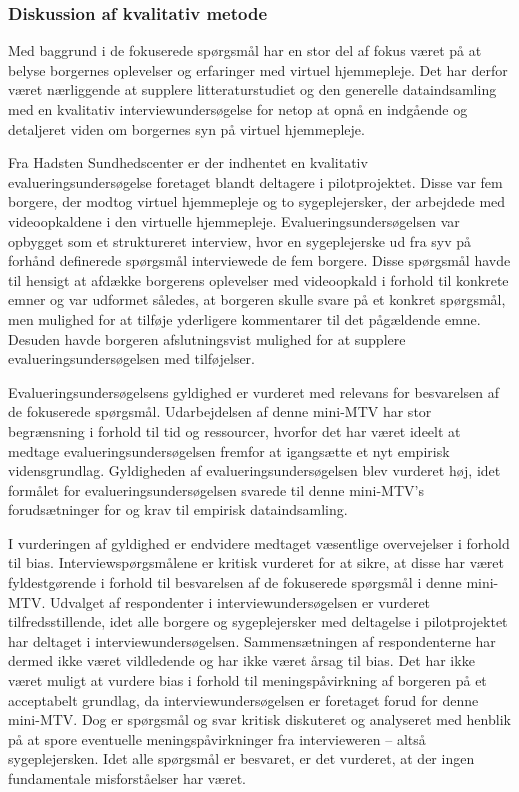 \subsubsection{Diskussion af kvalitativ metode}
Med baggrund i de fokuserede spørgsmål har en stor del af fokus været på at belyse borgernes oplevelser og erfaringer med virtuel hjemmepleje. Det har derfor været nærliggende at supplere litteraturstudiet og den generelle dataindsamling med en kvalitativ interviewundersøgelse for netop at opnå en indgående og detaljeret viden om borgernes syn på virtuel hjemmepleje. 

Fra Hadsten Sundhedscenter er der indhentet en kvalitativ evalueringsundersøgelse foretaget blandt deltagere i pilotprojektet. Disse var fem borgere, der modtog virtuel hjemmepleje og to sygeplejersker, der arbejdede med videoopkaldene i den virtuelle hjemmepleje. Evalueringsundersøgelsen var opbygget som et struktureret interview, hvor en sygeplejerske ud fra syv på forhånd definerede spørgsmål interviewede de fem borgere. Disse spørgsmål havde til hensigt at afdække borgerens oplevelser med videoopkald i forhold til konkrete emner og var udformet således, at borgeren skulle svare på et konkret spørgsmål, men mulighed for at tilføje yderligere kommentarer til det pågældende emne. Desuden havde borgeren afslutningsvist mulighed for at supplere evalueringsundersøgelsen med tilføjelser. 

Evalueringsundersøgelsens gyldighed er vurderet med relevans for besvarelsen af de fokuserede spørgsmål. Udarbejdelsen af denne mini-MTV har stor begrænsning i forhold til tid og ressourcer, hvorfor det har været ideelt at medtage evalueringsundersøgelsen fremfor at igangsætte et nyt empirisk vidensgrundlag. Gyldigheden af evalueringsundersøgelsen blev vurderet høj, idet formålet for evalueringsundersøgelsen svarede til denne mini-MTV’s forudsætninger for og krav til empirisk dataindsamling. 

I vurderingen af gyldighed er endvidere medtaget væsentlige overvejelser i forhold til bias. Interviewspørgsmålene er kritisk vurderet for at sikre, at disse har været fyldestgørende i forhold til besvarelsen af de fokuserede spørgsmål i denne mini-MTV. Udvalget af respondenter i interviewundersøgelsen er vurderet tilfredsstillende, idet alle borgere og sygeplejersker med deltagelse i pilotprojektet har deltaget i interviewundersøgelsen. Sammensætningen af respondenterne har dermed ikke været vildledende og har ikke været årsag til bias. Det har ikke været muligt at vurdere bias i forhold til meningspåvirkning af borgeren på et acceptabelt grundlag, da interviewundersøgelsen er foretaget forud for denne mini-MTV. Dog er spørgsmål og svar kritisk diskuteret og analyseret med henblik på at spore eventuelle meningspåvirkninger fra intervieweren – altså sygeplejersken. Idet alle spørgsmål er besvaret, er det vurderet, at der ingen fundamentale misforståelser har været.

